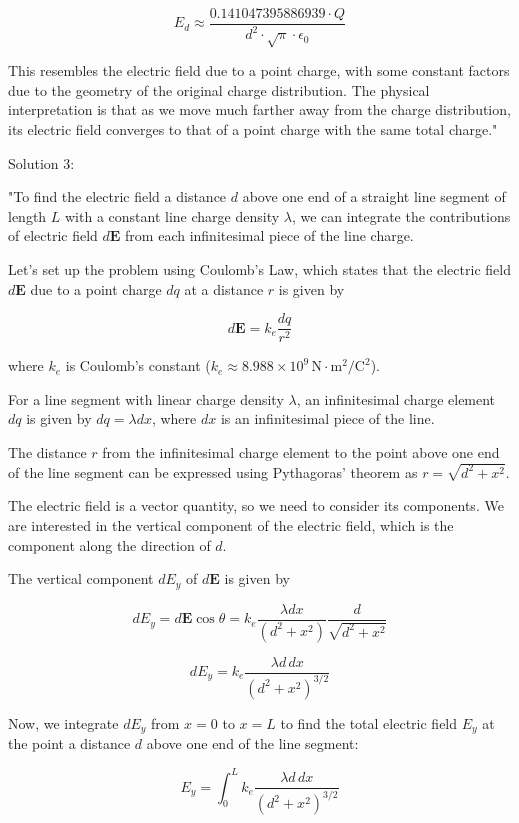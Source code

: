 \[ E_d \approx \frac{0.141047395886939 \cdot Q}{d^2 \cdot \sqrt{\pi} \cdot \epsilon_0} \]

This resembles the electric field due to a point charge, with some constant factors due to the geometry of the original charge distribution. The physical interpretation is that as we move much farther away from the charge distribution, its electric field converges to that of a point charge with the same total charge."

Solution 3: 

"To find the electric field a distance \( d \) above one end of a straight line segment of length \( L \) with a constant line charge density \( \lambda \), we can integrate the contributions of electric field \( d\mathbf{E} \) from each infinitesimal piece of the line charge.

Let's set up the problem using Coulomb's Law, which states that the electric field \( d\mathbf{E} \) due to a point charge \( dq \) at a distance \( r \) is given by

\[ d\mathbf{E} = k_e \frac{dq}{r^2} \]

where \( k_e \) is Coulomb's constant (\( k_e \approx 8.988 \times 10^9 \, \text{N}\cdot\text{m}^2/\text{C}^2 \)).

For a line segment with linear charge density \( \lambda \), an infinitesimal charge element \( dq \) is given by \( dq = \lambda dx \), where \( dx \) is an infinitesimal piece of the line.

The distance \( r \) from the infinitesimal charge element to the point above one end of the line segment can be expressed using Pythagoras' theorem as \( r = \sqrt{d^2 + x^2} \).

The electric field is a vector quantity, so we need to consider its components. We are interested in the vertical component of the electric field, which is the component along the direction of \( d \).

The vertical component \( dE_y \) of \( d\mathbf{E} \) is given by

\[ dE_y = d\mathbf{E} \cos\theta = k_e \frac{\lambda dx}{(d^2 + x^2)} \frac{d}{\sqrt{d^2 + x^2}} \]

\[ dE_y = k_e \frac{\lambda d\,dx}{(d^2 + x^2)^{3/2}} \]

Now, we integrate \( dE_y \) from \( x = 0 \) to \( x = L \) to find the total electric field \( E_y \) at the point a distance \( d \) above one end of the line segment:

\[ E_y = \int_0^L k_e \frac{\lambda d\,dx}{(d^2 + x^2)^{3/2}} \]

